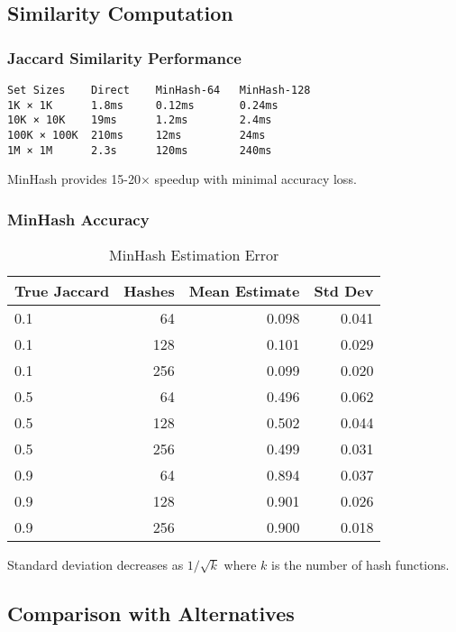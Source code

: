 \documentclass[../main_comprehensive.tex]{subfiles}
\begin{document}
\subsection{Similarity Computation}

\subsubsection{Jaccard Similarity Performance}

\begin{lstlisting}[language={},basicstyle=\scriptsize\ttfamily,frame=single,caption={Jaccard similarity computation time}]
Set Sizes    Direct    MinHash-64   MinHash-128
1K × 1K      1.8ms     0.12ms       0.24ms
10K × 10K    19ms      1.2ms        2.4ms
100K × 100K  210ms     12ms         24ms
1M × 1M      2.3s      120ms        240ms
\end{lstlisting}

MinHash provides 15-20× speedup with minimal accuracy loss.

\subsubsection{MinHash Accuracy}

\begin{table}[h]
\centering
\caption{MinHash Estimation Error}
\begin{tabular}{lrrr}
\toprule
True Jaccard & Hashes & Mean Estimate & Std Dev \\
\midrule
0.1 & 64 & 0.098 & 0.041 \\
0.1 & 128 & 0.101 & 0.029 \\
0.1 & 256 & 0.099 & 0.020 \\
0.5 & 64 & 0.496 & 0.062 \\
0.5 & 128 & 0.502 & 0.044 \\
0.5 & 256 & 0.499 & 0.031 \\
0.9 & 64 & 0.894 & 0.037 \\
0.9 & 128 & 0.901 & 0.026 \\
0.9 & 256 & 0.900 & 0.018 \\
\bottomrule
\end{tabular}
\end{table}

Standard deviation decreases as $1/\sqrt{k}$ where $k$ is the number of hash functions.

\subsection{Comparison with Alternatives}
\end{document}
